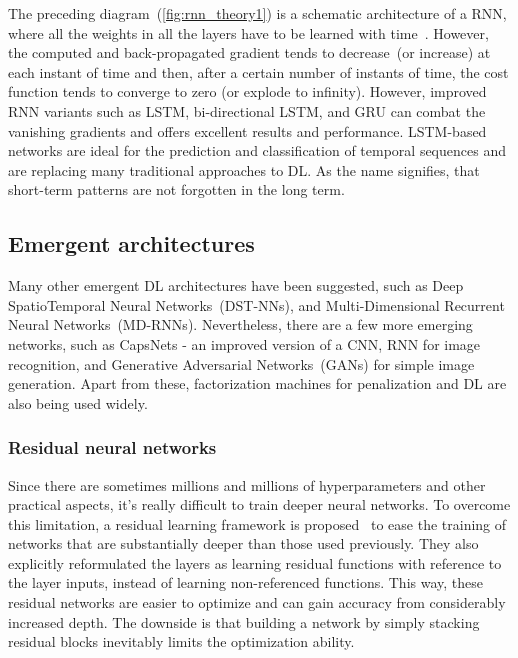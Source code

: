 \hspace*{3.5mm} The preceding diagram~(\cref{fig:rnn_theory1}) is a schematic architecture of a RNN, where all the weights in all the layers have to be learned with time~\cite{karimDLTF2018}. However, the computed and back-propagated gradient tends to decrease~(or increase) at each instant of time and then, after a certain number of instants of time, the cost function tends to converge to zero (or explode to infinity). However, improved RNN variants such as LSTM, bi-directional LSTM, and GRU can combat the vanishing gradients and offers excellent results and performance. LSTM-based networks are ideal for the prediction and classification of temporal sequences and are replacing many traditional approaches to DL. As the name signifies, that short-term patterns are not forgotten in the long term. 

\subsection{Emergent architectures}
Many other emergent DL architectures have been suggested, such as Deep SpatioTemporal Neural Networks~(DST-NNs), and Multi-Dimensional Recurrent Neural Networks~(MD-RNNs). Nevertheless, there are a few more emerging networks, such as CapsNets - an improved version of a CNN, RNN for image recognition, and Generative Adversarial Networks~(GANs) for simple image generation. Apart from these, factorization machines for penalization and DL are also being used widely. 

\subsubsection{Residual neural networks}
Since there are sometimes millions and millions of hyperparameters and other practical aspects, it's really difficult to train deeper neural networks. To overcome this limitation, a residual learning framework is proposed~\cite{zagoruyko2016wide} to ease the training of networks that are substantially deeper than those used previously. They also explicitly reformulated the layers as learning residual functions with reference to the layer inputs, instead of learning non-referenced functions. This way, these residual networks are easier to optimize and can gain accuracy from considerably increased depth. The downside is that building a network by simply stacking residual blocks inevitably limits the optimization ability. %

